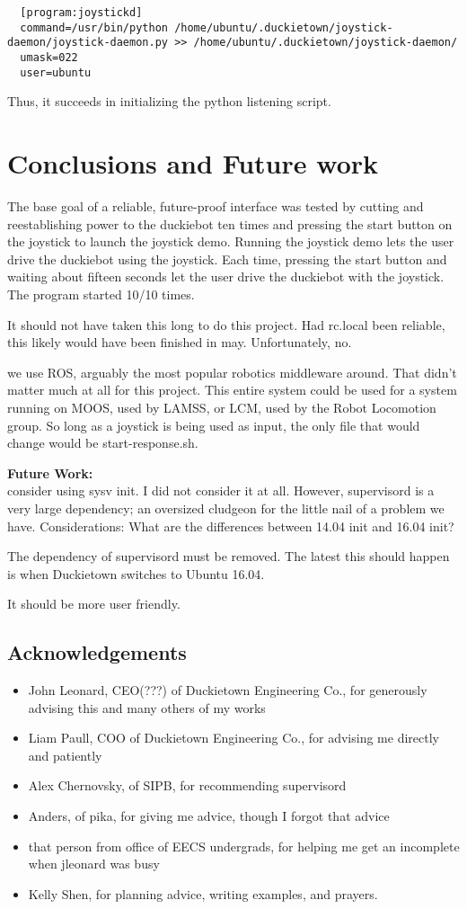 \documentclass[titlepage]{article}
\begin{document}
\begin{lstlisting}
  [program:joystickd]
  command=/usr/bin/python /home/ubuntu/.duckietown/joystick-daemon/joystick-daemon.py >> /home/ubuntu/.duckietown/joystick-daemon/
  umask=022
  user=ubuntu
\end{lstlisting}

Thus, it succeeds in initializing the python listening script.

\section{Conclusions and Future work}
The base goal of a reliable, future-proof interface was tested by cutting and reestablishing power to the duckiebot ten times and pressing the start button on the joystick to launch the joystick demo. Running the joystick demo lets the user drive the duckiebot using the joystick. Each time, pressing the start button and waiting about fifteen seconds let the user drive the duckiebot with the joystick. The program started 10/10 times. 

It should not have taken this long to do this project. Had rc.local been reliable, this likely would have been finished in may. Unfortunately, no. 

we use ROS, arguably the most popular robotics middleware around. That didn't matter much at all for this project. This entire system could be used for a system running on MOOS, used by LAMSS, or LCM, used by the Robot Locomotion group. So long as a joystick is being used as input, the only file that would change would be start-response.sh.

\textbf{Future Work:} \\
consider using sysv init. I did not consider it at all. However, supervisord is a very large dependency; an oversized cludgeon for the little nail of a problem we have. Considerations: What are the differences between 14.04 init and 16.04 init? 

The dependency of supervisord must be removed. The latest this should happen is when Duckietown switches to Ubuntu 16.04. 

It should be more user friendly.  
\subsection{Acknowledgements}
\begin{itemize}
\item John Leonard, CEO(???) of Duckietown Engineering Co., for generously advising this and many others of my works
\item Liam Paull, COO of Duckietown Engineering Co., for advising me directly and patiently
\item Alex Chernovsky, of SIPB, for recommending supervisord
\item Anders, of pika, for giving me advice, though I forgot that advice
\item that person from office of EECS undergrads, for helping me get an incomplete when jleonard was busy
\item Kelly Shen, for planning advice, writing examples, and prayers. 
\end{itemize}
\end{document}
